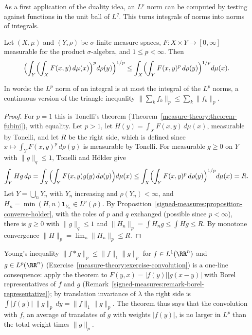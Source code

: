 As a first application of the duality idea, an $L^p$ norm can be computed by testing against functions in the unit ball of $L^q$. This turns integrals of norms into norms of integrals.

\begin{theorem}\label{signed-measures:theorem-minkowski-integral}
Let $(X, \mu)$ and $(Y, \rho)$ be $\sigma$-finite measure spaces, $F \colon X \times Y \to [0, \infty]$ measurable for the product $\sigma$-algebra, and $1 \leq p < \infty$. Then
\[
\Bigl(\int_Y\Bigl(\int_XF(x, y)\,d\mu(x)\Bigr)^pd\rho(y)\Bigr)^{1/p} \leq \int_X\Bigl(\int_YF(x, y)^p\,d\rho(y)\Bigr)^{1/p}d\mu(x).
\]
\end{theorem}

In words: the $L^p$ norm of an integral is at most the integral of the $L^p$ norms, a continuous version of the triangle inequality
$\|\sum_kf_k\|_p \leq \sum_k\|f_k\|_p$.

\begin{proof}
For $p = 1$ this is Tonelli's theorem (Theorem~\ref{measure-theory:theorem-fubini}), with equality. Let $p > 1$, let $H(y) = \int_XF(x, y)\,d\mu(x)$, measurable by Tonelli, and let $R$ be the right
side, which is defined since $x \mapsto \int_YF(x, y)^p\,d\rho(y)$ is measurable by Tonelli. For measurable $g \geq 0$ on $Y$ with $\|g\|_q \leq 1$, Tonelli and H\"older give
\[
\int_YHg\,d\rho = \int_X\Bigl(\int_YF(x, y)g(y)\,d\rho(y)\Bigr)d\mu(x) \leq \int_X\Bigl(\int_YF(x, y)^p\,d\rho(y)\Bigr)^{1/p}d\mu(x) = R .
\]
Let $Y = \bigcup_nY_n$ with $Y_n$ increasing and $\rho(Y_n) < \infty$, and $H_n = \min(H, n)\mathbf{1}_{Y_n} \in L^p(\rho)$. By Proposition~\ref{signed-measures:proposition-converse-holder}, with
the roles of $p$ and $q$ exchanged (possible since $p < \infty$), there is
$g \geq 0$ with $\|g\|_q \leq 1$ and $\|H_n\|_p = \int H_ng \leq \int Hg \leq R$. By monotone convergence $\|H\|_p = \lim_n\|H_n\|_p \leq R$.
\end{proof}

\begin{remark}\label{signed-measures:remark-young}
Young's inequality $\|f * g\|_p \leq \|f\|_1\|g\|_p$ for $f \in L^1(\RR^n)$ and $g \in L^p(\RR^n)$ (Exercise~\ref{measure-theory:exercise-convolution}) is a one-line consequence: apply the theorem to
$F(y, x) = |f(y)||g(x - y)|$ with Borel representatives of $f$ and $g$ (Remark~\ref{signed-measures:remark-borel-representative}); by translation invariance of $\lambda$ the right side is
$\int|f(y)|\,\|g\|_p\,dy = \|f\|_1\|g\|_p$. The theorem thus says that the convolution with $f$, an average of translates of $g$ with weights $|f(y)|$, is no larger in $L^p$ than the total weight times
$\|g\|_p$.
\end{remark}

